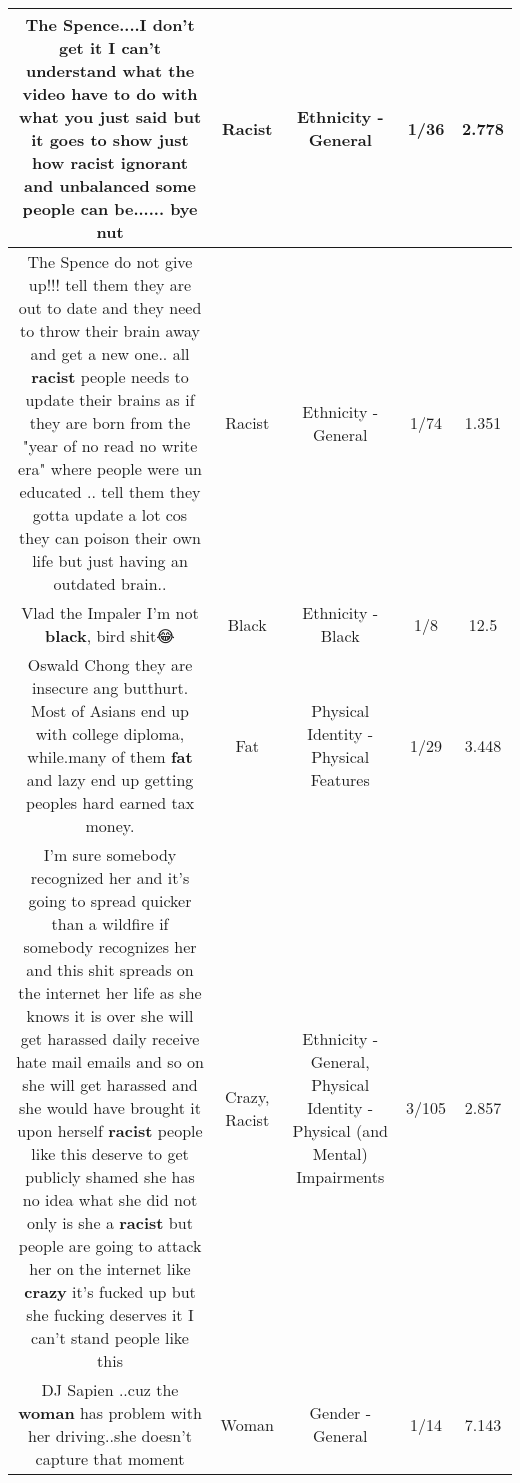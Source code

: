 \documentclass[11pt]{article}
\newlength\mylength
\begin{document}
\begin{center}
\begin{longtable}{|C{.65\mylength}|C{.30\mylength}|C{.12\mylength}|C{.12\mylength}|C{.12\mylength}|}
  \small The Spence....I don't get it I  can't understand  what the video have to do with what you just said but it goes to show just  how \textbf{racist} ignorant and unbalanced some people can be......  bye nut\normalsize   & Racist & Ethnicity - General & 1/36 & 2.778 \\  \hline
  \small The Spence do not give up!!! tell them they are out to date and they need to throw their brain away and get a new one.. all \textbf{racist} people needs to update their brains as if they are born from the "year of no read no write era" where people were un educated .. tell them they gotta update a lot cos they can poison their own life but just having an outdated brain..\normalsize   & Racist & Ethnicity - General & 1/74 & 1.351 \\  \hline
  \small Vlad the Impaler I'm not \textbf{black}, bird shit😂\normalsize   & Black & Ethnicity - Black & 1/8 & 12.5 \\  \hline
  \small Oswald Chong they are insecure ang butthurt. Most of Asians end up with college diploma, while.many of them \textbf{fat} and lazy end up getting peoples hard earned tax money.\normalsize   & Fat & Physical Identity - Physical Features & 1/29 & 3.448 \\  \hline
  \small I'm sure somebody recognized her and it's going to spread quicker than a wildfire if somebody recognizes her and this shit spreads on the internet her life as she knows it is over she will get harassed daily receive hate mail emails and so on she will get harassed and she would have brought it upon herself \textbf{racist} people like this deserve to get publicly shamed she has no idea what she did not only is she a \textbf{racist} but people are going to attack her on the internet like \textbf{crazy} it's fucked up but she fucking deserves it I can't stand people like this\normalsize   & Crazy, Racist & Ethnicity - General, Physical Identity - Physical (and Mental) Impairments & 3/105 & 2.857 \\  \hline
  \small DJ Sapien ..cuz the \textbf{woman} has  problem with her driving..she doesn't capture that moment\normalsize   & Woman & Gender - General & 1/14 & 7.143 \\  \hline

\end{longtable}
\end{center}
\end{document}
